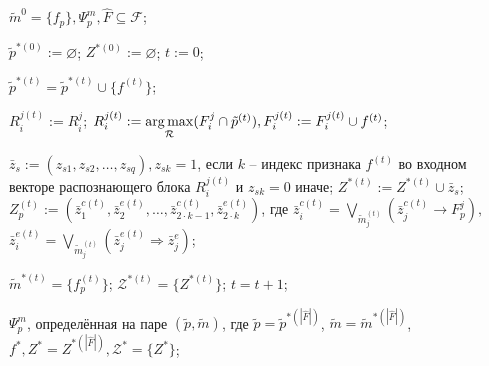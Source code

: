 	\Require $\tilde m^0=\{f_p\}, \Psi_p^m, \hat F\subseteq \mathcal F$;
	
	\State $\tilde p^{*(0)} := \varnothing$;
	\State $Z^{*(0)} := \varnothing$;
	\State $t := 0$;
	
			\State $\tilde p^{*(t)}=\tilde p^{*(t)}\cup\{f^{(t)}\}$;
	
				\State $R_i^{j(t)}:=R_i^j$;
			\Else
				\State $R_i^{j(t)}:=\operatorname*{arg\,max}\limits_{\mathcal R} (F_i^j\cap\tilde p^{(t)}), F_i^{j(t)}:=F_i^{j(t)}\cup f^{(t)}$;
			\EndIf
	
			\State $\bar z_s:=(z_{s1},z_{s2},\dots,z_{sq}), z_{sk}=1$, если $k$ -- индекс признака $f^{(t)}$ во входном векторе распознающего блока $R_i^{j(t)}$ и $z_{sk}=0$ иначе;
			\State $Z^{*(t)}:=Z^{*(t)}\cup\bar z_s$;
			\State $Z_p^{(t)}:=(\bar z_1^{c(t)},\bar z_2^{e(t)},\dots,\bar z_{2\cdot k-1}^{c(t)},\bar z_{2\cdot k}^{e(t)})$, где $\bar z_i^{c(t)}=\bigvee\limits_{\tilde m_j^{(t)}}(\bar z_j^{c(t)}\rightarrow F_p^j),$ 
	\\\hspace{3.0cm}$\bar z_i^{e(t)}=\bigvee\limits_{\tilde m_j^{(t)}}(\bar z_j^{e(t)}\Rightarrow\bar z_j^e)$;
		\EndIf
	
		\State $\tilde m^{*(t)}=\{f_p^{(t)}\}$;
		\State $\mathcal Z^{*(t)}=\{Z^{*(t)}\}$;
		\State $t=t+1$;
	\EndFor
	
	\Return $\Psi_p^m$, определённая на паре $(\tilde p, \tilde m)$, где $\tilde p=\tilde p^{*(|\hat F|)}$, $\tilde m=\tilde m^{*(|\hat F|)}$, $f^*, Z^*=Z^{*(|\hat F|)},\mathcal Z^*=\{Z^*\}$;